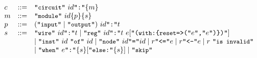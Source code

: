 \begin{figure}[htbp]
{\footnotesize
\[
\begin{array}{l l l}
c & ::= & \mbox{\tt ``\prettyll{circuit}''}\ id\mbox{\tt ``:''} \{m\}\\
%
m & ::= & \mbox{\tt ``\prettyll{module}''} \ id \{p\} \{s\}\\
%
%
p & ::= & (\mbox{\tt ``\prettyll{input}''} \mid \mbox{\tt ``\prettyll{output}''})\ id\mbox{\tt ``:''}t \\
%
 s & ::= & \mbox{\tt ``\prettyll{wire}''}\ id\mbox{\tt ``:''}t  \mid \mbox{\tt ``\prettyll{reg}''}\ id\mbox{\tt ``:''}t\ e [\mbox{\tt ``(\prettyll{with}:\{\prettyll{reset}=>(''} e\mbox{\tt ``,''} e \mbox{\tt ``)\})''}] \\
  &   &  \mid
  \mbox{\tt ``\prettyll{inst}''}\ id\ \mbox{\tt ``\prettyll{of}''}\ id \mid \mbox{\tt ``\prettyll{node}''}\ id \mbox{\tt ``=''} id  \mid r \mbox{\tt ``<=''} e  \mid r \mbox{\tt ``<-''} e \mid r\ \mbox{\tt ``\prettyll{is invalid}''} \\
&   &\mid \mbox{\tt ``\prettyll{when}''}\ e\mbox{\tt ``:''}\{s\} [\mbox{\tt ``\prettyll{else}:''} \{s\}] \mid \mbox{\tt ``\prettyll{skip}''}\\
%
%

\end{array}\]}
\end{figure}
